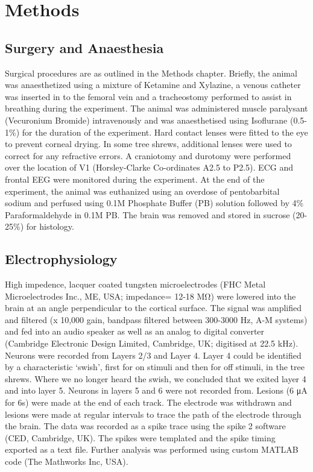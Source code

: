 	\section{Methods}
		
		\subsection{Surgery and Anaesthesia}
		Surgical procedures are as outlined in the Methods chapter. Briefly, the animal was anaesthetized using a mixture of Ketamine and Xylazine, a venous catheter was inserted in to the femoral vein and a tracheostomy performed to assist in breathing during the experiment. The animal was administered muscle paralysant (Vecuronium Bromide) intravenously and was anaesthetised using Isoflurane (0.5-1\%) for the duration of the experiment. Hard contact lenses were fitted to the eye to prevent corneal drying. In some tree shrews, additional lenses were used to correct for any refractive errors. A craniotomy and durotomy were performed over the location of V1 (Horsley-Clarke Co-ordinates A2.5 to P2.5). ECG and frontal EEG were monitored during the experiment. At the end of the experiment, the animal was euthanized using an overdose of pentobarbital sodium and perfused using 0.1M Phosphate Buffer (PB) solution followed by 4\% Paraformaldehyde in 0.1M PB. The brain was removed and stored in sucrose (20-25\%) for histology.
	
		\subsection{Electrophysiology}
		High impedence, lacquer coated tungsten microelectrodes (FHC Metal Microelectrodes Inc., ME, USA; impedance= 12-18 MΩ) were lowered into the brain at an angle perpendicular to the cortical surface. The signal was amplified and filtered (x 10,000 gain, bandpass filtered between 300-3000 Hz, A-M systems) and fed into an audio speaker as well as an analog to digital converter (Cambridge Electronic Design Limited, Cambridge, UK; digitised at 22.5 kHz). Neurons were recorded from Layers 2/3 and Layer 4. Layer 4 could be identified by a characteristic ‘swish’, first for on stimuli and then for off stimuli, in the tree shrews. Where we no longer heard the swish, we concluded that we exited layer 4 and into layer 5. Neurons in layers 5 and 6 were not recorded from. Lesions (6 μA for 6s) were made at the end of each track. The electrode was withdrawn and lesions were made at regular intervals to trace the path of the electrode through the brain. The data was recorded as a spike trace using the spike 2 software (CED, Cambridge, UK). The spikes were templated and the spike timing exported as a text file. Further analysis was performed using custom MATLAB code (The Mathworks Inc, USA).
